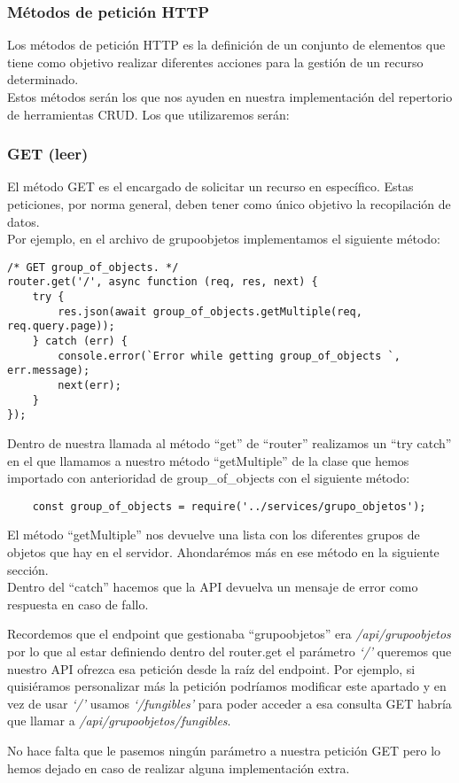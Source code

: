 \subsubsection{Métodos de petición HTTP}
Los métodos de petición HTTP es la definición de un conjunto de elementos que tiene como objetivo realizar diferentes acciones para la gestión de un recurso determinado.
\\Estos métodos serán los que nos ayuden en nuestra implementación del repertorio de herramientas CRUD. Los que utilizaremos serán:

\subsubsection{GET (leer)}
El método GET es el encargado de solicitar un recurso en específico. Estas peticiones, por norma general, deben tener como único objetivo la recopilación de datos.
\\Por ejemplo, en el archivo de grupoobjetos implementamos el siguiente método:
\begin{verbatim}
/* GET group_of_objects. */
router.get('/', async function (req, res, next) {
    try {
        res.json(await group_of_objects.getMultiple(req, req.query.page));
    } catch (err) {
        console.error(`Error while getting group_of_objects `, err.message);
        next(err);
    }
});
\end{verbatim}
Dentro de nuestra llamada al método ``get'' de ``router'' realizamos un ``try catch'' en el que llamamos a nuestro método ``getMultiple'' de la clase que hemos importado con anterioridad de group\_of\_objects con el siguiente método:
\begin{verbatim}
    const group_of_objects = require('../services/grupo_objetos');
\end{verbatim}
El método ``getMultiple'' nos devuelve una lista con los diferentes grupos de objetos que hay en el servidor. Ahondarémos más en ese método en la siguiente sección. 
\\Dentro del ``catch'' hacemos que la API devuelva un mensaje de error como respuesta en caso de fallo.
\begin{tcolorbox}
    [colback=green!5!white,colframe=green!75!black,fonttitle=\bfseries,title=Personalización de peticiones]
    Recordemos que el endpoint que gestionaba ``grupoobjetos'' era \textit{/api/grupoobjetos} por lo que al estar definiendo dentro del router.get el parámetro \textit{`/'} queremos que nuestro API ofrezca esa petición desde la raíz del endpoint. Por ejemplo, si quisiéramos personalizar más la petición podríamos modificar este apartado y en vez de usar \textit{`/'} usamos \textit{`/fungibles'} para poder acceder a esa consulta GET habría que llamar a \textit{/api/grupoobjetos/fungibles}.
\end{tcolorbox}
No hace falta que le pasemos ningún parámetro a nuestra petición GET pero lo hemos dejado en caso de realizar alguna implementación extra.

